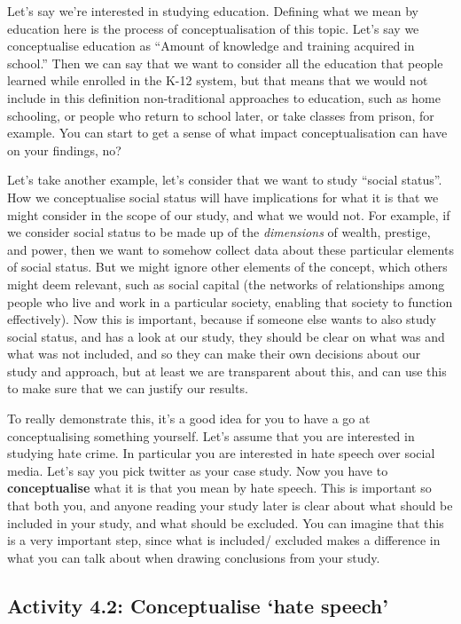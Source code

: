 \documentclass[
]{book}
\begin{document}
Let's say we're interested in studying education. Defining what we mean by education here is the process of conceptualisation of this topic. Let's say we conceptualise education as ``Amount of knowledge and training acquired in school.'' Then we can say that we want to consider all the education that people learned while enrolled in the K-12 system, but that means that we would not include in this definition non-traditional approaches to education, such as home schooling, or people who return to school later, or take classes from prison, for example. You can start to get a sense of what impact conceptualisation can have on your findings, no?

Let's take another example, let's consider that we want to study ``social status''. How we conceptualise social status will have implications for what it is that we might consider in the scope of our study, and what we would not. For example, if we consider social status to be made up of the \emph{dimensions} of wealth, prestige, and power, then we want to somehow collect data about these particular elements of social status. But we might ignore other elements of the concept, which others might deem relevant, such as social capital (the networks of relationships among people who live and work in a particular society, enabling that society to function effectively). Now this is important, because if someone else wants to also study social status, and has a look at our study, they should be clear on what was and what was not included, and so they can make their own decisions about our study and approach, but at least we are transparent about this, and can use this to make sure that we can justify our results.

To really demonstrate this, it's a good idea for you to have a go at conceptualising something yourself. Let's assume that you are interested in studying hate crime. In particular you are interested in hate speech over social media. Let's say you pick twitter as your case study. Now you have to \textbf{conceptualise} what it is that you mean by hate speech. This is important so that both you, and anyone reading your study later is clear about what should be included in your study, and what should be excluded. You can imagine that this is a very important step, since what is included/ excluded makes a difference in what you can talk about when drawing conclusions from your study.

\hypertarget{activity-4.2-conceptualise-hate-speech}{%
\subsection{Activity 4.2: Conceptualise `hate speech'}\label{activity-4.2-conceptualise-hate-speech}}
\end{document}
